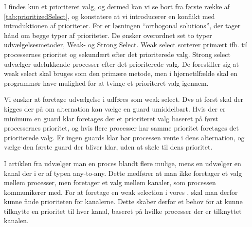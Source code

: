 I \pycsp findes kun et prioriteret valg, og dermed kan vi se bort fra første række af \cref{tab:prioritizedSelect}, og konstatere at vi introducerer  en konflikt med introduktionen af prioriteter. For \citeauthor{Burns1990} er løsningen ``orthogonal solutions'', der  tager hånd om begge typer af prioriteter. De ønsker overordnet set to typer udvælgelsesmetoder, Weak- og Strong Select. Weak select sorterer primært ifh. til processernes prioritet og sekundært efter det prioriterede valg. Strong select udvælger udelukkende processer efter det prioriterede valg. De forestiller sig at weak select skal bruges som den primære metode, men i hjørnetilfælde skal en programmør have mulighed for at tvinge et prioriteret valg igennem.

Vi ønsker at foretage udvælgelse i  udføres som weak select. Dvs at først skal der kigges der på om alternation kan vælge en guard umiddelbart. Hvis der er minimum en guard klar foretages der et prioriteret valg baseret på først processernes prioritet, og hvis flere processer har samme prioritet  foretages det prioriterede valg. Er ingen guards klar bør processen vente i dens alternation, og vælge den første guard der bliver klar, uden at skele til dens prioritet.

I artiklen fra \citeauthor{Burns1990} udvælger man en proces blandt flere mulige, mens en  udvælger en kanal der i \pycsp er af typen any-to-any. Dette medfører at man ikke  foretager et valg mellem processer, men foretager et valg mellem kanaler, som processen kommunikerer med. For at foretage en weak selection i vores , skal man derfor kunne finde prioriteten for kanalerne. Dette skaber derfor et behov for at kunne tilknytte en prioritet til hver kanal, baseret på hvilke processer der er tilknyttet kanalen. 
\label{misc:kanal-prioritet}


